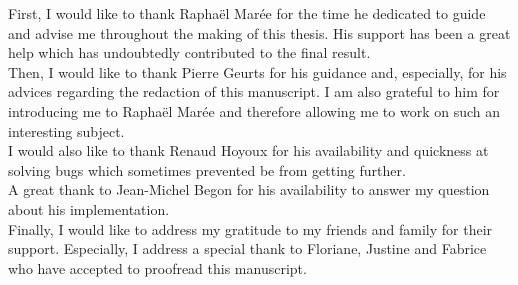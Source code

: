 First, I would like to thank Raphaël Marée for the time he dedicated to guide and advise me throughout the making of this thesis. His support has been a great help which has undoubtedly contributed to the final result. 
\\

Then, I would like to thank Pierre Geurts for his guidance and, especially, for his advices regarding the redaction of this manuscript. I am also grateful to him for introducing me to Raphaël Marée and therefore allowing me to work on such an interesting subject. 
\\

I would also like to thank Renaud Hoyoux for his availability and quickness at solving bugs which sometimes prevented be from getting further.
\\

A great thank to Jean-Michel Begon for his availability to answer my question about his implementation. 
\\

Finally, I would like to address my gratitude to my friends and family for their support. Especially, I address a special thank to Floriane, Justine and Fabrice who have accepted to proofread this manuscript.


